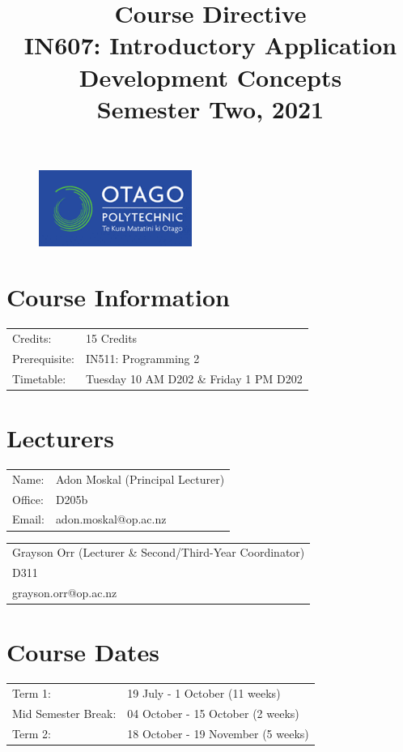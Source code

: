 \documentclass{article}
\author{}
\begin{document}
 

\begin{figure}
	\includegraphics[width=50mm]{../img/logo.png} 
\end{figure}

\title{Course Directive\\IN607: Introductory Application Development Concepts\\Semester Two, 2021}
\date{}
\maketitle

\section*{Course Information}
\begin{tabular}{ll}
	Credits:            & 15 Credits                             \\
	Prerequisite:       & IN511: Programming 2                   \\
	Timetable:  & Tuesday 10 AM D202 \& Friday 1 PM D202       
\end{tabular} 

\section*{Lecturers}
\begin{tabular}{ll}
	Name:   & Adon Moskal (Principal Lecturer) \\
	Office: & D205b                            \\
	Email:  & adon.moskal@op.ac.nz             \\
\end{tabular}
\begin{tabular}{l}
	Grayson Orr (Lecturer \& Second/Third-Year Coordinator) \\
	D311                   \\
	grayson.orr@op.ac.nz   \\
\end{tabular}

\section*{Course Dates}
\begin{tabular}{ll} 
	Term 1:             & 19 July - 1 October (11 weeks) \\
	Mid Semester Break: & 04 October - 15 October (2 weeks)    \\
	Term 2:             & 18 October - 19 November (5 weeks)          
\end{tabular}
\end{document}
